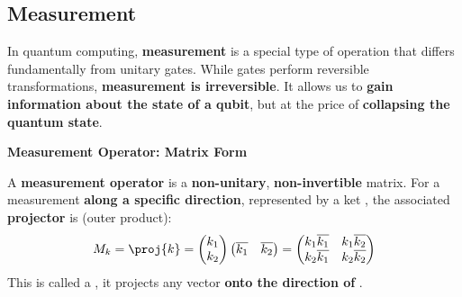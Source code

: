 \subsection{Measurement}\label{sec:measurement}

In quantum computing, \textbf{measurement} is a special type of operation that differs fundamentally from unitary gates. While gates perform reversible transformations, \textbf{measurement is irreversible}. It allows us to \textbf{gain information about the state of a qubit}, but at the price of \textbf{collapsing the quantum state}.

\highspace
\begin{flushleft}
  \textcolor{Green3}{ \textbf{Measurement Operator: Matrix Form}}
\end{flushleft}
A \textbf{measurement operator} is a \textbf{non-unitary}, \textbf{non-invertible} matrix. For a measurement \textbf{along a specific direction}, represented by a ket , the associated \textbf{projector} is (outer product):
\begin{equation}\label{eq:measurement-operator}
  M_{k} = \proj{k} = \begin{pmatrix}
    k_{1} \\
    k_{2}
  \end{pmatrix}
  \begin{pmatrix}
    \overline{k_{1}} & \overline{k_{2}}
  \end{pmatrix}
   =
  \begin{pmatrix}
    k_{1} \overline{k_{1}} & k_{1} \overline{k_{2}} \\
    k_{2} \overline{k_{1}} & k_{2} \overline{k_{2}}
  \end{pmatrix}
\end{equation}
This is called a , it projects any vector \textbf{onto the direction of} .

